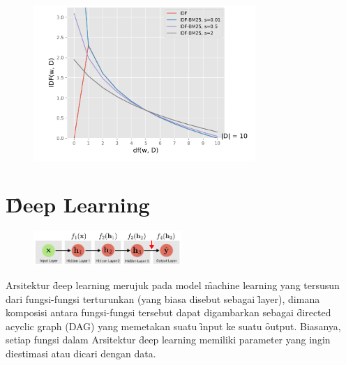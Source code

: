     \begin{figure}
        \centering
        \includegraphics[width=0.75\textwidth]{assets/pics/smoothed-idf.png}
        \label{fig:smoothed-idf}
    \end{figure}


\section{\f{Deep Learning}}
    \begin{figure}
        \centering
        \includegraphics[width=0.50\textwidth]{assets/pics/dag-dl.png}
        \label{fig:deep-learning-FFN-dag}
    \end{figure}
    Arsitektur \f{deep learning} merujuk pada model \f{machine learning} yang tersusun dari fungsi-fungsi terturunkan (yang biasa disebut sebagai \f{layer}), dimana komposisi antara fungsi-fungsi tersebut dapat digambarkan sebagai \f{directed acyclic graph} (DAG) yang memetakan suatu \f{input} ke suatu \f{output}. Biasanya, setiap fungsi dalam Arsitektur \f{deep learning} memiliki parameter yang ingin diestimasi atau dicari dengan data.
    
